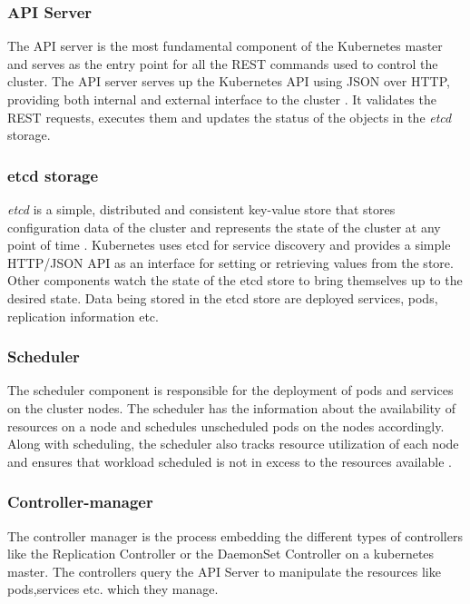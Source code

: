 \documentclass[9pt,twocolumn,twoside]{../../styles/osajnl}
\begin{document}
\subsubsection{API Server}
The API server is the most fundamental component of the Kubernetes
master and serves as the entry point for all the REST commands used to
control the cluster. The API server serves up the Kubernetes API using
JSON over HTTP, providing both internal and external interface to the
cluster \cite{www-kubernetes-digitalocean}
\cite{www-apiserver-kmblog}. It validates the REST requests, executes
them and updates the status of the objects in the \emph{etcd} storage.

\subsubsection{etcd storage}
\emph{etcd} is a simple, distributed and consistent key-value store
that stores configuration data of the cluster and represents the state
of the cluster at any point of time
\cite{www-wiki-kubernetes}. Kubernetes uses etcd for service discovery
and provides a simple HTTP/JSON API as an interface for setting or
retrieving values from the store. Other components watch the state of
the etcd store to bring themselves up to the desired state. Data being
stored in the etcd store are deployed services, pods, replication
information etc.

\subsubsection{Scheduler}
The scheduler component is responsible for the deployment of pods and
services on the cluster nodes. The scheduler has the information about
the availability of resources on a node and schedules unscheduled pods
on the nodes accordingly. Along with scheduling, the scheduler also
tracks resource utilization of each node and ensures that workload
scheduled is not in excess to the resources available \cite{www-wiki-kubernetes}.

\subsubsection{Controller-manager}
The controller manager is the process embedding the different types of
controllers like the Replication Controller or the DaemonSet
Controller on a kubernetes master. The controllers query the API
Server to manipulate the resources like pods,services etc. which they
manage.
\end{document}
